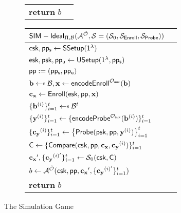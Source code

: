 \begin{figure}[h]
\begin{center}
\begin{subfigure}[t]{0.49\textwidth}
\begin{tabular}{l c}
			\textbf{return} $b$
			
		\end{tabular}
		\end{subfigure}
		\begin{subfigure}[t]{0.49\textwidth}
		\begin{tabular}{l c}
			${\sf SIM-Ideal}_{\Pi, \mathcal{B}}(\mathcal{A}^{\tilde{\mathcal{O}}}, \mathcal{S} = (\mathcal{S}_0, \mathcal{S}_{\sf Enroll}, \mathcal{S}_{\sf Probe}))$\\

			\hline

			${\sf csk}, {\sf pp_s} \gets {\sf SSetup(1^\lambda)}$ \\

			${\sf esk}, {\sf psk}, {\sf pp_u} \gets {\sf USetup}(1^\lambda, {\sf pp_s})$ \\

			${\sf pp}:= ({\sf pp_s}, {\sf pp_u})$ \\
			
			$ \mathbf{b} \getsdollar \mathcal{B}, \mathbf{x} \gets {\sf encodeEnroll}^{\mathcal{O}_{\sf aux}}(\mathbf{b})$ \\

			$\mathbf{c_x} \gets {\sf Enroll}({\sf esk}, {\sf pp}, \mathbf{x})$ \\

			$\{ \mathbf{b}^{(i)} \}_{i=1}^t \getsdollar \mathcal{B}^t$ \\ 

			$\{\mathbf{y}^{(i)}\}_{i=1}^t \gets \{{\sf encodeProbe}^{\mathcal{O}_{\sf aux}}(\mathbf{b}^{(i)})\}_{i=1}^t $ \\
			
			$\{ \mathbf{c_y}^{(i)} \}_{i=1}^t \gets \left\{ {\sf Probe}( {\sf psk}, {\sf pp}, \mathbf{y}^{(i)} ) \right \}_{i=1}^t$ \\

			${\sf C} \gets \{ {\sf Compare}({\sf csk}, {\sf pp}, \mathbf{c_x}, \mathbf{c_y}^{(i)}) \}_{i=1}^t$ \\

			$\mathbf{c_x}', \{\mathbf{c_y}^{(i)'}\}_{i=1}^t \gets \mathcal{S}_0( {\sf csk}, {\sf C} )$ \\

			$b \gets \mathcal{A}^{\tilde{\mathcal{O}}} ({\sf csk}, {\sf pp}, \mathbf{c_x}', \{ \mathbf{c_y}^{(i)'} \}_{i=1}^t )$ \\

			\textbf{return} $b$
			
		\end{tabular}
		\end{subfigure}
	\end{center}
	\caption{The Simulation Game}
	\label{fig:sim_game}
\end{figure}

